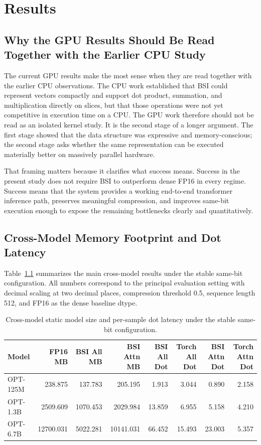 \chapter{Results}

\section{Why the GPU Results Should Be Read Together with the Earlier CPU Study}
The current GPU results make the most sense when they are read together with the earlier CPU observations. The CPU work established that BSI could represent vectors compactly and support dot product, summation, and multiplication directly on slices, but that those operations were not yet competitive in execution time on a CPU. The GPU work therefore should not be read as an isolated kernel study. It is the second stage of a longer argument. The first stage showed that the data structure was expressive and memory-conscious; the second stage asks whether the same representation can be executed materially better on massively parallel hardware.

That framing matters because it clarifies what success means. Success in the present study does not require BSI to outperform dense FP16 in every regime. Success means that the system provides a working end-to-end transformer inference path, preserves meaningful compression, and improves same-bit execution enough to expose the remaining bottlenecks clearly and quantitatively.

\section{Cross-Model Memory Footprint and Dot Latency}
Table~\ref{tab:crossmodel-latency} summarizes the main cross-model results under the stable same-bit configuration. All numbers correspond to the principal evaluation setting with decimal scaling at two decimal places, compression threshold 0.5, sequence length 512, and FP16 as the dense baseline dtype.

\begin{table}[H]
\centering
\caption{Cross-model static model size and per-sample dot latency under the stable same-bit configuration.}
\label{tab:crossmodel-latency}
\begin{tabular}{lrrrrrrr}
\toprule
Model & FP16 MB & BSI All MB & BSI Attn MB & BSI All Dot & Torch All Dot & BSI Attn Dot & Torch Attn Dot \\
\midrule
OPT-125M & 238.875 & 137.783 & 205.195 & 1.913 & 3.044 & 0.890 & 2.158 \\
OPT-1.3B & 2509.609 & 1070.453 & 2029.984 & 13.859 & 6.955 & 5.158 & 4.210 \\
OPT-6.7B & 12700.031 & 5022.281 & 10141.031 & 66.452 & 15.493 & 23.003 & 5.357 \\
\bottomrule
\end{tabular}
\end{table}

